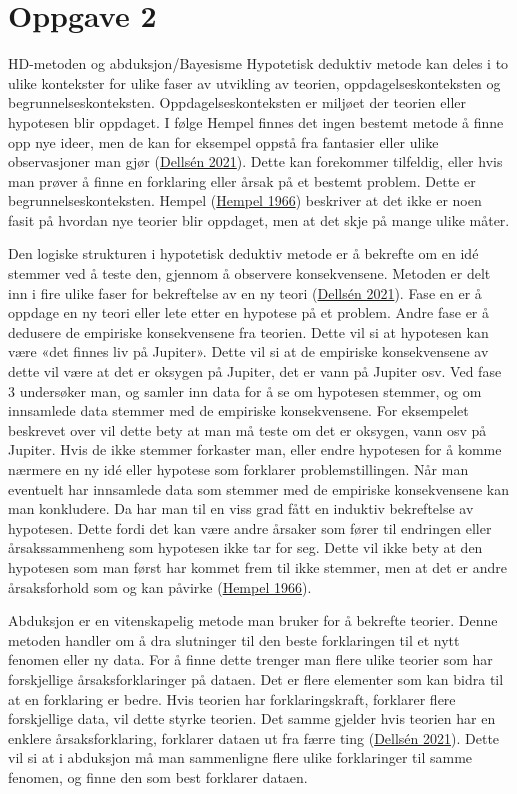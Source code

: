 \documentclass[
]{book}
\begin{document}
\hypertarget{oppgave-2}{%
\section{Oppgave 2}\label{oppgave-2}}

HD-metoden og abduksjon/Bayesisme Hypotetisk deduktiv metode kan deles i
to ulike kontekster for ulike faser av utvikling av teorien,
oppdagelseskonteksten og begrunnelseskonteksten. Oppdagelseskonteksten
er miljøet der teorien eller hypotesen blir oppdaget. I følge Hempel
finnes det ingen bestemt metode å finne opp nye ideer, men de kan for
eksempel oppstå fra fantasier eller ulike observasjoner man gjør
(\protect\hyperlink{ref-dellsuxe9n2021}{Dellsén 2021}). Dette kan
forekommer tilfeldig, eller hvis man prøver å finne en forklaring eller
årsak på et bestemt problem. Dette er begrunnelseskonteksten. Hempel
(\protect\hyperlink{ref-hempel1966}{Hempel 1966}) beskriver at det ikke
er noen fasit på hvordan nye teorier blir oppdaget, men at det skje på
mange ulike måter.

Den logiske strukturen i hypotetisk deduktiv metode er å bekrefte om en
idé stemmer ved å teste den, gjennom å observere konsekvensene. Metoden
er delt inn i fire ulike faser for bekreftelse av en ny teori
(\protect\hyperlink{ref-dellsuxe9n2021}{Dellsén 2021}). Fase en er å
oppdage en ny teori eller lete etter en hypotese på et problem. Andre
fase er å dedusere de empiriske konsekvensene fra teorien. Dette vil si
at hypotesen kan være «det finnes liv på Jupiter». Dette vil si at de
empiriske konsekvensene av dette vil være at det er oksygen på Jupiter,
det er vann på Jupiter osv. Ved fase 3 undersøker man, og samler inn
data for å se om hypotesen stemmer, og om innsamlede data stemmer med de
empiriske konsekvensene. For eksempelet beskrevet over vil dette bety at
man må teste om det er oksygen, vann osv på Jupiter. Hvis de ikke
stemmer forkaster man, eller endre hypotesen for å komme nærmere en ny
idé eller hypotese som forklarer problemstillingen. Når man eventuelt
har innsamlede data som stemmer med de empiriske konsekvensene kan man
konkludere. Da har man til en viss grad fått en induktiv bekreftelse av
hypotesen. Dette fordi det kan være andre årsaker som fører til
endringen eller årsakssammenheng som hypotesen ikke tar for seg. Dette
vil ikke bety at den hypotesen som man først har kommet frem til ikke
stemmer, men at det er andre årsaksforhold som og kan påvirke
(\protect\hyperlink{ref-hempel1966}{Hempel 1966}).

Abduksjon er en vitenskapelig metode man bruker for å bekrefte teorier.
Denne metoden handler om å dra slutninger til den beste forklaringen til
et nytt fenomen eller ny data. For å finne dette trenger man flere ulike
teorier som har forskjellige årsaksforklaringer på dataen. Det er flere
elementer som kan bidra til at en forklaring er bedre. Hvis teorien har
forklaringskraft, forklarer flere forskjellige data, vil dette styrke
teorien. Det samme gjelder hvis teorien har en enklere årsaksforklaring,
forklarer dataen ut fra færre ting
(\protect\hyperlink{ref-dellsuxe9n2021}{Dellsén 2021}). Dette vil si at
i abduksjon må man sammenligne flere ulike forklaringer til samme
fenomen, og finne den som best forklarer dataen.
\end{document}

